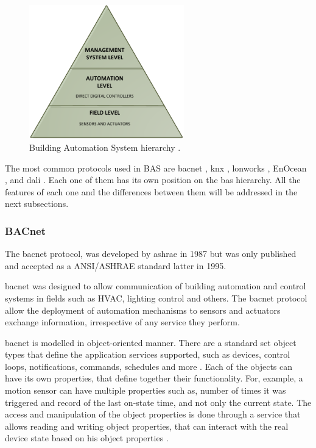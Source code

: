 \begin{figure}[H]
	\centering
	\includegraphics[width=0.6\textwidth]{figures/hierarchy.png}
	\caption{Building Automation System hierarchy \cite{kastener}. }
	\label{fig:hierarchy}
\end{figure}

The most common protocols used in BAS are \acf{bacnet} \cite{bacnet}, \acf{knx} \cite{knx}, \acf{lonworks} \cite{EchelonCorporation2009}, EnOcean \cite{enocean}, and \acf{dali} \cite{dali}. Each one of them has its own position on the \ac{bas} hierarchy. All the features of each one and the differences between them will be addressed in the next subsections.


\subsubsection{BACnet}
The \acf{bacnet} protocol, was developed by \acf{ashrae} in 1987 but was only published and accepted as a ANSI/ASHRAE standard latter in 1995.

\ac{bacnet} was designed to allow communication of building automation and control systems in fields such as HVAC, lighting control and others. The \ac{bacnet} protocol allow the deployment of automation mechanisms to sensors and actuators exchange information, irrespective of any service they perform.

\ac{bacnet} is modelled in object-oriented manner. There are a standard set object types that define the application services supported, such as devices, control loops, notifications, commands, schedules and more \cite{Domingues2016}. Each of the objects can have its own properties, that define together their functionality. For, example, a motion sensor can have multiple properties such as, number of times it was triggered and record of the last on-state time, and not only the current state. The access and manipulation of the object properties is done through a service that allows reading and writing object properties, that can interact with the real device state based on his object properties \cite{Fernbach2011}.

